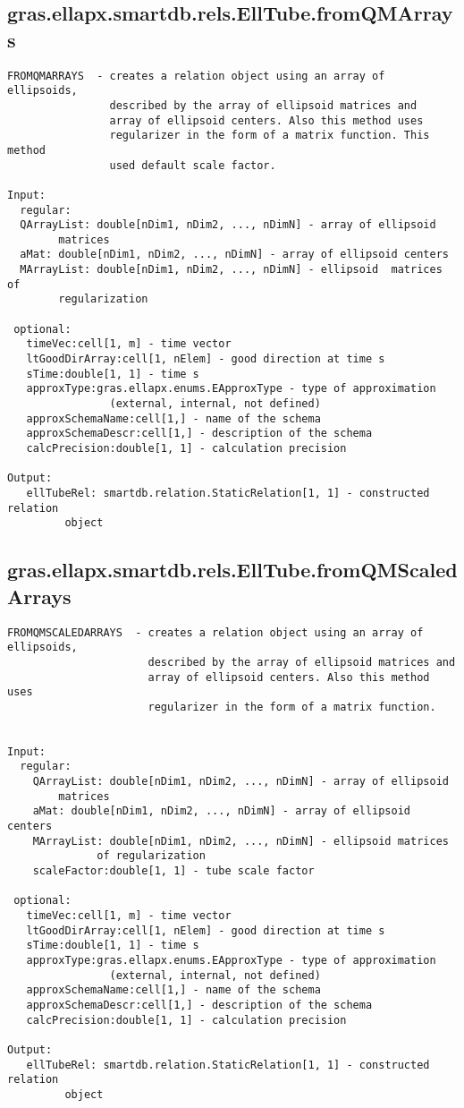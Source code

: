 \subsection{\texorpdfstring{gras.ellapx.smartdb.rels.EllTube.fromQMArrays}{fromQMArrays}}\label{method:gras.ellapx.smartdb.rels.EllTube.fromQMArrays}
\begin{verbatim}
FROMQMARRAYS  - creates a relation object using an array of ellipsoids,
                described by the array of ellipsoid matrices and
                array of ellipsoid centers. Also this method uses
                regularizer in the form of a matrix function. This method
                used default scale factor.

Input:
  regular:
  QArrayList: double[nDim1, nDim2, ..., nDimN] - array of ellipsoid
        matrices
  aMat: double[nDim1, nDim2, ..., nDimN] - array of ellipsoid centers
  MArrayList: double[nDim1, nDim2, ..., nDimN] - ellipsoid  matrices of
        regularization

 optional:
   timeVec:cell[1, m] - time vector
   ltGoodDirArray:cell[1, nElem] - good direction at time s
   sTime:double[1, 1] - time s
   approxType:gras.ellapx.enums.EApproxType - type of approximation
                (external, internal, not defined)
   approxSchemaName:cell[1,] - name of the schema
   approxSchemaDescr:cell[1,] - description of the schema
   calcPrecision:double[1, 1] - calculation precision

Output:
   ellTubeRel: smartdb.relation.StaticRelation[1, 1] - constructed relation
         object
\end{verbatim}
\subsection{\texorpdfstring{gras.ellapx.smartdb.rels.EllTube.fromQMScaledArrays}{fromQMScaledArrays}}\label{method:gras.ellapx.smartdb.rels.EllTube.fromQMScaledArrays}
\begin{verbatim}
FROMQMSCALEDARRAYS  - creates a relation object using an array of ellipsoids,
                      described by the array of ellipsoid matrices and
                      array of ellipsoid centers. Also this method uses
                      regularizer in the form of a matrix function.


Input:
  regular:
    QArrayList: double[nDim1, nDim2, ..., nDimN] - array of ellipsoid
        matrices
    aMat: double[nDim1, nDim2, ..., nDimN] - array of ellipsoid centers
    MArrayList: double[nDim1, nDim2, ..., nDimN] - ellipsoid matrices
              of regularization
    scaleFactor:double[1, 1] - tube scale factor

 optional:
   timeVec:cell[1, m] - time vector
   ltGoodDirArray:cell[1, nElem] - good direction at time s
   sTime:double[1, 1] - time s
   approxType:gras.ellapx.enums.EApproxType - type of approximation
                (external, internal, not defined)
   approxSchemaName:cell[1,] - name of the schema
   approxSchemaDescr:cell[1,] - description of the schema
   calcPrecision:double[1, 1] - calculation precision

Output:
   ellTubeRel: smartdb.relation.StaticRelation[1, 1] - constructed relation
         object
\end{verbatim}
